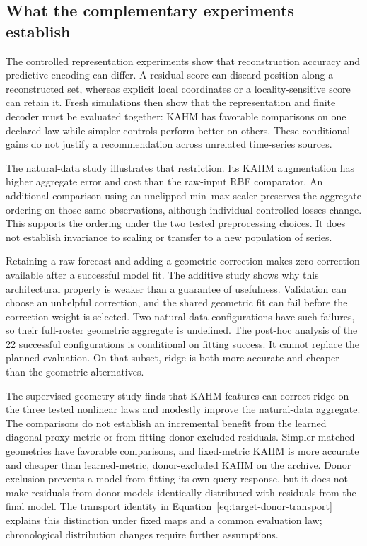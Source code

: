 \subsection{What the complementary experiments establish}
The controlled representation experiments show that reconstruction
accuracy and predictive encoding can differ. A residual score can discard
position along a reconstructed set, whereas explicit local coordinates
or a locality-sensitive score can retain it. Fresh simulations then show
that the representation and finite decoder must be evaluated together:
KAHM has favorable comparisons on one declared law while simpler controls
perform better on others. These conditional gains do not justify a
recommendation across unrelated time-series sources.

The natural-data study illustrates that restriction. Its KAHM augmentation
has higher aggregate error and cost than the raw-input RBF comparator.
An additional comparison using an unclipped min--max scaler preserves
the aggregate ordering on those same observations, although individual
controlled losses change. This supports the ordering under the two tested
preprocessing choices. It does not establish invariance to scaling or
transfer to a new population of series.

Retaining a raw forecast and adding a geometric correction makes zero
correction available after a successful model fit. The additive study
shows why this architectural property is weaker than a guarantee of
usefulness. Validation can choose an unhelpful correction, and the shared
geometric fit can fail before the correction weight is selected. Two
natural-data configurations have such failures, so their full-roster
geometric aggregate is undefined. The post-hoc analysis of the 22
successful configurations is conditional on fitting success. It cannot
replace the planned evaluation. On that subset, ridge is both more
accurate and cheaper than the geometric alternatives.

The supervised-geometry study finds that KAHM features can correct ridge
on the three tested nonlinear laws and modestly improve the natural-data
aggregate. The comparisons do not establish an incremental benefit from
the learned diagonal proxy metric or from fitting donor-excluded
residuals. Simpler matched geometries have favorable comparisons, and
fixed-metric KAHM is more accurate and cheaper than learned-metric,
donor-excluded KAHM on the archive. Donor exclusion prevents a model from
fitting its own query response, but it does not make residuals from donor
models identically distributed with residuals from the final model.
The transport identity in Equation~\eqref{eq:target-donor-transport}
explains this distinction under fixed maps and a common evaluation law;
chronological distribution changes require further assumptions.

